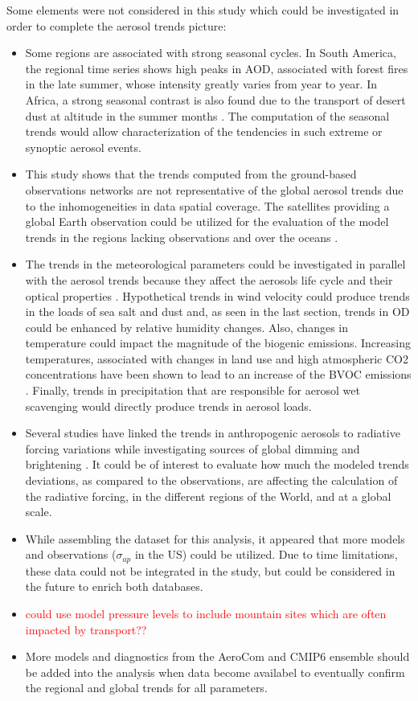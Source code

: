 \documentclass[journal abbreviation, manuscript]{copernicus}
\begin{document}
Some elements were not considered in this study which could be investigated in order to complete the aerosol trends picture:
\begin{itemize}
 \item Some regions are associated with strong seasonal cycles. In South America, the regional time series shows high peaks in AOD, associated with forest fires in the late summer, whose intensity greatly varies from year to year. In Africa, a strong seasonal contrast is also found due to the transport of desert dust at altitude in the summer months \citep{mortier2016, ogunjobi2008synoptic}. The computation of the seasonal trends would allow characterization of the tendencies in such extreme or synoptic aerosol events.
 \item  This study shows that the trends computed from the ground-based observations networks are not representative of the global aerosol trends due to the inhomogeneities in data spatial coverage. The satellites providing a global Earth observation could be utilized for the evaluation of the model trends in the regions lacking observations and over the oceans \citep{hsu2012global,zhang2010decadal}.
 \item The trends in the meteorological parameters could be investigated in parallel with the aerosol trends because they affect the aerosols life cycle and their optical properties \citep{che2019large}. Hypothetical trends in wind velocity could produce trends in the loads of sea salt and dust and, as seen in the last section, trends in OD could be enhanced by relative humidity changes. Also, changes in temperature could impact the magnitude of the biogenic emissions. Increasing temperatures, associated with changes in land use and high atmospheric CO2 concentrations have been shown to lead to an increase of the BVOC emissions \citep{penuelas2010bvocs}. Finally, trends in precipitation that are responsible for aerosol wet scavenging would directly produce trends in aerosol loads.
 \item Several studies have linked the trends in anthropogenic aerosols to radiative forcing variations while investigating sources of global dimming and brightening \cite{streets2006two,norris2007trends}. It could be of interest to evaluate how much the modeled trends deviations, as compared to the observations, are affecting the calculation of the radiative forcing, in the different regions of the World, and at a global scale.
 \item While assembling the dataset for this analysis, it appeared that more models and observations ($\sigma_{ap}$ in the US) could be utilized. Due to time limitations, these data could not be integrated in the study, but could be considered in the future to enrich both databases.
 \item \textcolor{red}{could use model pressure levels to include mountain sites which are often impacted by transport??}
\item More models and diagnostics from the AeroCom and CMIP6 ensemble should be added into the analysis when data become availabel to eventually confirm the regional and global trends for all parameters.
\end{itemize}
\end{document}
